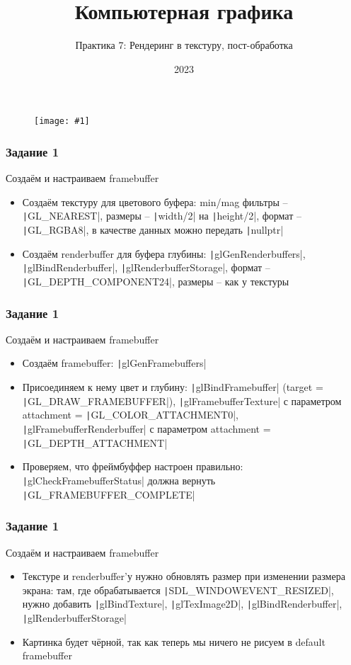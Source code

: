 \documentclass{beamer}
\title{Компьютерная графика}
\subtitle{Практика 7: Рендеринг в текстуру, пост-обработка}
\date{2023}
\newcommand{\slideimage}[1]{
  \begin{figure}
    \begin{adjustbox}{width=\textwidth, totalheight=\textheight-2\baselineskip-2\baselineskip,keepaspectratio}
      \texttt{[image: \#1]}
    \end{adjustbox}
  \end{figure}
}
\begin{document}
\frame{\titlepage}

\begin{frame}[fragile]
\slideimage{0.png}
\end{frame}


\begin{frame}[fragile]
\frametitle{Задание 1}
Создаём и настраиваем framebuffer
\begin{itemize}
\item Создаём текстуру для цветового буфера: min/mag фильтры -- \texttt|GL_NEAREST|, размеры -- \texttt|width/2| на \texttt|height/2|, формат -- \texttt|GL_RGBA8|, в качестве данных можно передать \texttt|nullptr|
\item Создаём renderbuffer для буфера глубины: \texttt|glGenRenderbuffers|, \texttt|glBindRenderbuffer|, \texttt|glRenderbufferStorage|, формат -- \texttt|GL_DEPTH_COMPONENT24|, размеры -- как у текстуры
\end{itemize}
\end{frame}

\begin{frame}[fragile]
\frametitle{Задание 1}
Создаём и настраиваем framebuffer
\begin{itemize}
\item Создаём framebuffer: \texttt|glGenFramebuffers|
\item Присоединяем к нему цвет и глубину: \texttt|glBindFramebuffer| (target = \texttt|GL_DRAW_FRAMEBUFFER|), \texttt|glFramebufferTexture| с параметром attachment = \texttt|GL_COLOR_ATTACHMENT0|, \texttt|glFramebufferRenderbuffer| с параметром attachment = \texttt|GL_DEPTH_ATTACHMENT|
\item Проверяем, что фреймбуффер настроен правильно: \texttt|glCheckFramebufferStatus| должна вернуть \texttt|GL_FRAMEBUFFER_COMPLETE|
\end{itemize}
\end{frame}

\begin{frame}[fragile]
\frametitle{Задание 1}
Создаём и настраиваем framebuffer
\begin{itemize}
\item Текстуре и renderbuffer'у нужно обновлять размер при изменении размера экрана: там, где обрабатывается \texttt|SDL_WINDOWEVENT_RESIZED|, нужно добавить \texttt|glBindTexture|, \texttt|glTexImage2D|, \texttt|glBindRenderbuffer|, \texttt|glRenderbufferStorage|
\item Картинка будет чёрной, так как теперь мы ничего не рисуем в default framebuffer
\end{itemize}
\end{frame}
\end{document}
